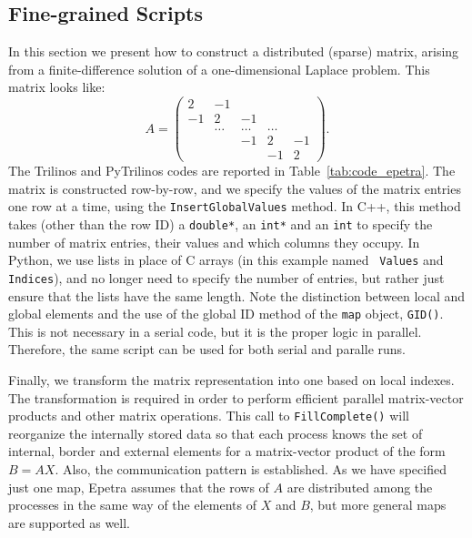 \documentclass[acmtocl]{acmtrans2m}
\begin{document}
\subsection{Fine-grained Scripts}
\label{sec:fine}

In this section we present how to construct a distributed (sparse)
matrix, arising from a finite-difference solution of a
one-dimensional Laplace problem. This matrix looks like:
\begin{equation*}
  A = \begin{pmatrix}
     2 & -1     &        &        &    \\
    -1 &  2     & -1     &        &    \\
       & \ldots & \ldots & \ldots &    \\
       &        & -1     & 2      & -1 \\
       &        &        & -1     & 2
  \end{pmatrix}.
\end{equation*}
The Trilinos and PyTrilinos codes are reported in
Table~\ref{tab:code_epetra}.  The matrix is constructed row-by-row,
and we specify the values of the matrix entries one row at a time,
using the {\tt InsertGlobalValues} method.  In C++, this method takes
(other than the row ID)
a {\tt double*}, an {\tt int*} and an {\tt int}  to specify the number
of matrix entries, their values and which columns they occupy.  In
Python, we use lists in place of C arrays (in this example named {\tt
  Values} and {\tt Indices}), and no longer need to specify the number
of entries, but rather just ensure that the lists have the same
length.  Note the distinction between local and global elements and
the use of the global ID method of the {\tt map} object, {\tt GID()}.
This is not necessary in a serial code, but it is the proper logic in
parallel. Therefore, the same script can be used for both serial and paralle
runs.

Finally, we transform the matrix representation into one based on
local indexes. The transformation is required in order to perform
efficient parallel matrix-vector products and other matrix
operations. This call to {\tt FillComplete()} will reorganize the
internally stored data so that each process knows the set of internal,
border and external elements for a matrix-vector product of the form
$B = AX$. Also, the communication pattern is established. As we have
specified just one map, Epetra assumes that the rows of $A$ are
distributed among the processes in the same way of the elements of $X$
and $B$, but more general maps are supported as well.
\end{document}
